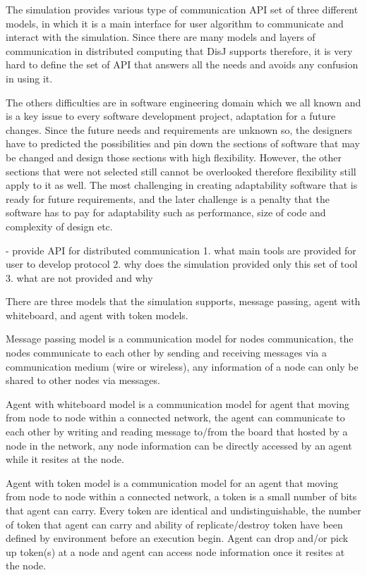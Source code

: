 The simulation provides various type of communication API set of three different models, in which it is a main interface for user algorithm to communicate and interact with the simulation. Since there are many models and layers of communication in distributed computing that DisJ supports therefore, it is very hard to define the set of API that answers all the needs and avoids any confusion in using it.

The others difficulties are in software engineering domain which we all known and is a key issue to every software development project, adaptation for a future changes. Since the future needs and requirements are unknown so, the designers have to predicted the possibilities and pin down the sections of software that may be changed and design those sections with high flexibility. However, the other sections that were not selected still cannot be overlooked therefore flexibility still apply to it as well. The most challenging in creating adaptability software that is ready for future requirements, and the later challenge is a penalty that the software has to pay for adaptability such as performance, size of code and complexity of design etc.


- provide API for distributed communication
1. what main tools are provided for user to develop protocol
2. why does the simulation provided only this set of tool
3. what are not provided and why

There are three models that the simulation supports, message passing, agent with whiteboard, and agent with token models.

Message passing model is a communication model for nodes communication, the nodes communicate to each other by sending and receiving messages via a communication medium (wire or wireless), any information of a node can only be shared to other nodes via messages.

Agent with whiteboard model is a communication model for agent that moving from node to node within a connected network, the agent can communicate to each other by writing and reading message to/from the board that hosted by a node in the network, any node information can be directly accessed by an agent while it resites at the node.

Agent with token model is a communication model for an agent that moving from node to node within a connected network, a token is a small number of bits that agent can carry. Every token are identical and undistinguishable, the number of token that agent can carry and ability of replicate/destroy token have been defined by environment before an execution begin. Agent can drop and/or pick up token(s) at a node and agent can access node information once it resites at the node.

